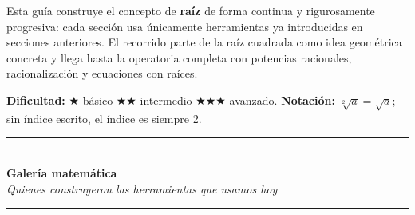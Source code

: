 \documentclass[11pt, letterpaper]{article}
\begin{document}
\begin{tcolorbox}[importantbox, title={Propósito de la guía}]
Esta guía construye el concepto de \textbf{raíz} de forma continua y rigurosamente progresiva: cada sección usa únicamente herramientas ya introducidas en secciones anteriores. El recorrido parte de la raíz cuadrada como idea geométrica concreta y llega hasta la operatoria completa con potencias racionales, racionalización y ecuaciones con raíces.

\smallskip
\textbf{Dificultad:} $\bigstar$ básico \quad $\bigstar\bigstar$ intermedio \quad $\bigstar\bigstar\bigstar$ avanzado. \quad \textbf{Notación:} $\sqrt[2]{a}=\sqrt{a}$; sin índice escrito, el índice es siempre 2.
\end{tcolorbox}

\clearpage
\thispagestyle{empty}
\label{sec:galeria}

\begin{center}
  \vspace*{0.4cm}
  \textcolor{zenitnavy}{\rule{0.72\linewidth}{1.2pt}}\\[0.5cm]
  {\Large\bfseries\color{zenitnavy} Galería matemática}\\[0.15cm]
  {\normalsize\itshape\color{zenitgold} Quienes construyeron las herramientas que usamos hoy}\\[0.4cm]
  \textcolor{zenitnavy}{\rule{0.72\linewidth}{0.6pt}}
\end{center}

\vspace{0.6cm}

\end{document}
